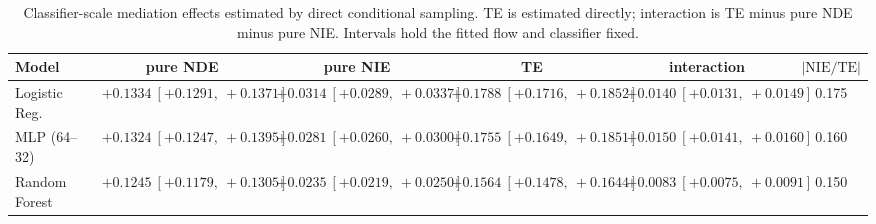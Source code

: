 \begin{table}[htbp]
  \centering
  \caption{Classifier-scale mediation effects estimated by direct conditional sampling. TE is estimated directly; interaction is TE minus pure NDE minus pure NIE. Intervals hold the fitted flow and classifier fixed.}
  \label{tab:adult_gap_overall}
  \begin{tabular}{lccccc}
    \toprule
    Model & pure NDE & pure NIE & TE & interaction & $|\mathrm{NIE}/\mathrm{TE}|$ \\
    \midrule
    Logistic Reg. & $+0.1334\ [+0.1291,\ +0.1371]$ & $+0.0314\ [+0.0289,\ +0.0337]$ & $+0.1788\ [+0.1716,\ +0.1852]$ & $+0.0140\ [+0.0131,\ +0.0149]$ & 0.175 \\
    MLP (64--32) & $+0.1324\ [+0.1247,\ +0.1395]$ & $+0.0281\ [+0.0260,\ +0.0300]$ & $+0.1755\ [+0.1649,\ +0.1851]$ & $+0.0150\ [+0.0141,\ +0.0160]$ & 0.160 \\
    Random Forest & $+0.1245\ [+0.1179,\ +0.1305]$ & $+0.0235\ [+0.0219,\ +0.0250]$ & $+0.1564\ [+0.1478,\ +0.1644]$ & $+0.0083\ [+0.0075,\ +0.0091]$ & 0.150 \\
    \bottomrule
  \end{tabular}
\end{table}